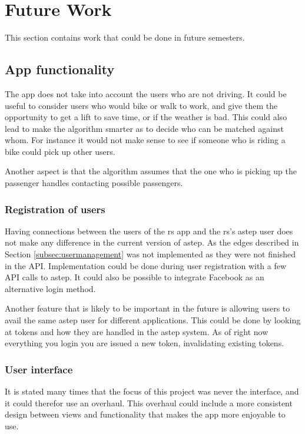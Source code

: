 \section{Future Work}\label{sec:future}
This section contains work that could be done in future semesters.

\subsection{App functionality}
The app does not take into account the users who are not driving.
It could be useful to consider users who would bike or walk to work, and give them the opportunity to get a lift to save time, or if the weather is bad.
This could also lead to make the algorithm smarter as to decide who can be matched against whom.
For instance it would not make sense to see if someone who is riding a bike could pick up other users.

Another aspect is that the algorithm assumes that the one who is picking up the passenger handles contacting possible passengers.

\subsubsection*{Registration of users}
Having connections between the users of the \gls{rs} app and the \gls{rs}'s \gls{astep} user does not make any difference in the current version of \gls{astep}.
As the edges described in Section \ref{subsec:usermanagement} was not implemented as they were not finished in the API.
Implementation could be done during user registration with a few API calls to \gls{astep}.
It could also be possible to integrate Facebook as an alternative login method.

Another feature that is likely to be important in the future is allowing users to avail the same \gls{astep} user for different applications.
This could be done by looking at tokens and how they are handled in the \gls{astep} system.
As of right now everything you login you are issued a new token, invalidating existing tokens.

\subsubsection*{User interface}
It is stated many times that the focus of this project was never the interface, and it could therefor use an overhaul.
This overhaul could include a more consistent design between views and functionality that makes the app more enjoyable to use.

